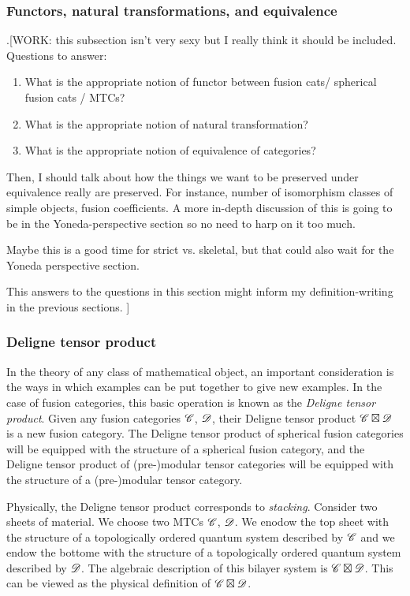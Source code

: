 \subsubsection{Functors, natural transformations, and equivalence}

.[WORK: this subsection isn't very sexy but I really think it should be included. Questions to answer:

\begin{enumerate}
\item What is the appropriate notion of functor between fusion cats/ spherical fusion cats / MTCs?
\item What is the appropriate notion of natural transformation?
\item What is the appropriate notion of equivalence of categories?
\end{enumerate}


Then, I should talk about how the things we want to be preserved under equivalence really are preserved. For instance, number of isomorphism classes of simple objects, fusion coefficients. A more in-depth discussion of this is going to be in the Yoneda-perspective section so no need to harp on it too much.

Maybe this is a good time for strict vs. skeletal, but that could also wait for the Yoneda perspective section.

This answers to the questions in this section might inform my definition-writing in the previous sections.
]

\subsubsection{Deligne tensor product}

In the theory of any class of mathematical object, an important consideration is the ways in which examples can be put together to give new examples. In the case of fusion categories, this basic operation is known as the \textit{Deligne tensor product}. Given any fusion categories $\mathscr{C}$, $\mathscr{D}$, their Deligne tensor product $\mathscr{C}\boxtimes \mathscr{D}$ is a new fusion category. The Deligne tensor product of spherical fusion categories will be equipped with the structure of a spherical fusion category, and the Deligne tensor product of (pre-)modular tensor categories will be equipped with the structure of a (pre-)modular tensor category.

Physically, the Deligne tensor product corresponds to \textit{stacking}. Consider two sheets of material. We choose two MTCs $\mathscr{C}$, $\mathscr{D}$. We enodow the top sheet with the structure of a topologically ordered quantum system described by $\mathscr{C}$ and we endow the bottome with the structure of a topologically ordered quantum system described by $\mathscr{D}$. The algebraic description of this bilayer system is $\mathscr{C}\boxtimes \mathscr{D}$. This can be viewed as the physical definition of $\mathscr{C}\boxtimes \mathscr{D}$.

